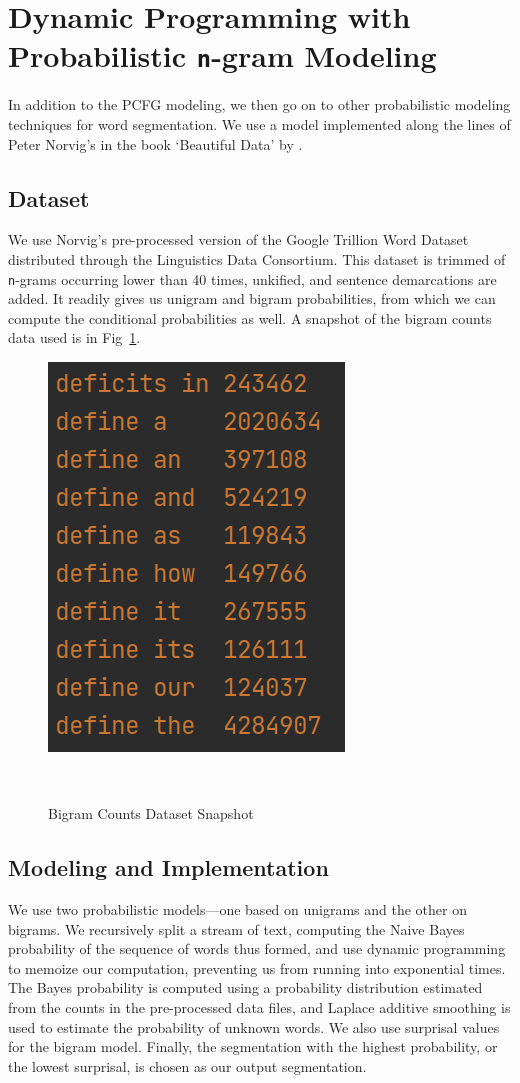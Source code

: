 \documentclass{article}
\begin{document}
\section{Dynamic Programming with Probabilistic \texttt{n}-gram Modeling}
In addition to the PCFG modeling, we then go on to other probabilistic modeling techniques for word segmentation. We use a model implemented along the lines of Peter Norvig's in the book `Beautiful Data' by \citet{segaran_hammerbacher_2009}.

\subsection{Dataset}
We use Norvig's pre-processed version of the Google Trillion Word Dataset distributed through the Linguistics Data Consortium. This dataset is trimmed of \texttt{n}-grams occurring lower than 40 times, unkified, and sentence demarcations are added. It readily gives us unigram and bigram probabilities, from which we can compute the conditional probabilities as well. A snapshot of the bigram counts data used is in Fig~\ref{fig:figure4}.

\begin{figure}[h!]
  \centering
  \includegraphics[scale=0.6]{figures/bigram_counts.png}
  \caption{Bigram Counts Dataset Snapshot}~\label{fig:figure4}
\end{figure}
\vspace{-3mm}
\subsection{Modeling and Implementation}
We use two probabilistic models---one based on unigrams and the other on bigrams. We recursively split a stream of text, computing the Naive Bayes probability of the sequence of words thus formed, and use dynamic programming to memoize our computation, preventing us from running into exponential times. The Bayes probability is computed using a probability distribution estimated from the counts in the pre-processed data files, and Laplace additive smoothing is used to estimate the probability of unknown words. We also use surprisal values for the bigram model. Finally, the segmentation with the highest probability, or the lowest surprisal, is chosen as our output segmentation.
\vspace{-1mm}
\end{document}
